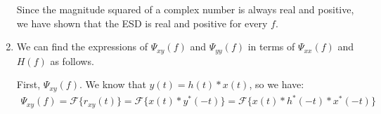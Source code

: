 \documentclass{article}
\begin{document}
\begin{enumerate}[label=2.\arabic*]
    Since the magnitude squared of a complex number is always real and positive, we have shown that the ESD is real and positive for every $f$.

    \item We can find the expressions of $\Psi_{xy}(f)$ and $\Psi_{yy}(f)$ in terms of $\Psi_{xx}(f)$ and $H(f)$ as follows.

    First, $\Psi_{xy}(f)$. We know that $y(t) = h(t) \ast x(t)$, so we have:
    \begin{align}
        \Psi_{xy}(f) = \mathcal{F}\{r_{xy}(t)\} = \mathcal{F}\{x(t) \ast y^*(-t)\} = \mathcal{F}\{x(t) \ast h^*(-t) \ast x^*(-t)\}
    \end{align}
\end{enumerate}

\end{document}
